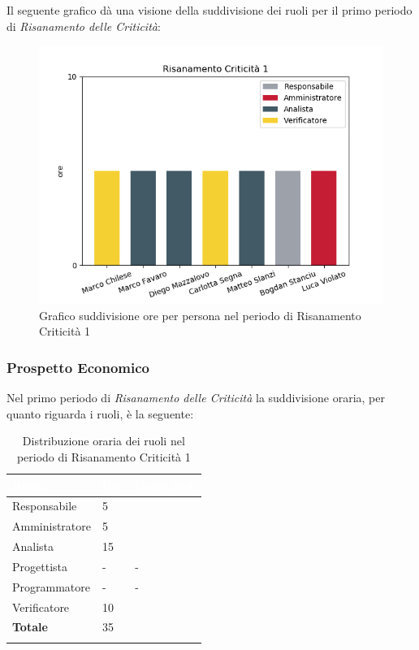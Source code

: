 Il seguente grafico dà una visione della suddivisione dei ruoli per il primo periodo di \textit{Risanamento delle Criticità}:
\begin{figure}[H]
  \centering
  \includegraphics[width=0.8\linewidth]{./images/fig_rc1.png}
  \caption{Grafico suddivisione ore per persona nel periodo di Risanamento Criticità 1}
  \label{fig:grafico suddivione ruoli rc1}
\end{figure}

\subsubsection{Prospetto Economico}
Nel primo periodo di \textit{Risanamento delle Criticità} la suddivisione oraria, per quanto riguarda i ruoli, è la seguente: 


\begin{longtable}{| C{.30\textwidth}| C{.15\textwidth}| C{.20\textwidth}|}
\hline
{}\textbf{\textcolor{white}{Ruolo}} & \textbf{\textcolor{white}{Ore}} & \textbf{\textcolor{white}{Costo in \euro}} \\
\hline 
Responsabile & 5 &  \\
\hline
{}Amministratore & 5 &  \\
\hline
Analista & 15 &  \\
\hline
{}Progettista & - & - \\
\hline
Programmatore & - & - \\
\hline
{}Verificatore & 10 & \\
\hline
\textbf{Totale} & 35 &  \\
\hline


\caption{Distribuzione oraria dei ruoli nel periodo di Risanamento Criticità 1}
\label{Distribuzione oraria ruoli del periodo di rc1}
\end{longtable}

